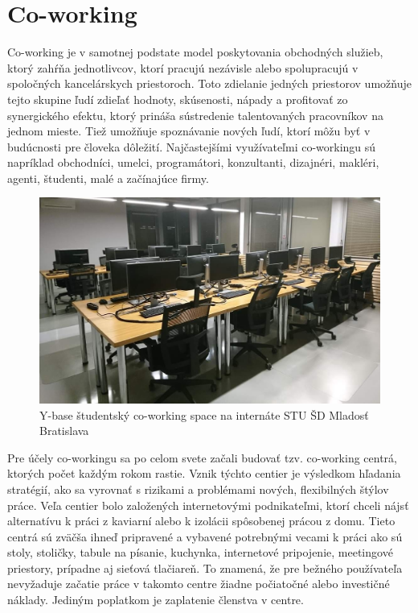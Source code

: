 \section{Co-working}
\indent Co-working je v samotnej podstate model poskytovania obchodných služieb, ktorý zahŕňa jednotlivcov, ktorí pracujú nezávisle alebo spolupracujú v spoločných kancelárskych priestoroch. Toto zdielanie jedných priestorov umožňuje tejto skupine ľudí zdieľať hodnoty, skúsenosti, nápady a profitovať zo synergického efektu, ktorý prináša sústredenie talentovaných pracovníkov na jednom mieste. Tiež umožňuje spoznávanie nových ľudí, ktorí môžu byť v budúcnosti pre človeka dôležití. Najčastejšími využívateľmi co-workingu sú napríklad obchodníci, umelci, programátori, konzultanti, dizajnéri, makléri, agenti, študenti, malé a začínajúce firmy.

\begin{figure}[H]
    \centering
    \includegraphics[scale=0.40]{img/ybase.jpg}
    \caption{Y-base študentský co-working space na internáte STU ŠD Mladosť Bratislava}
    \label{fig:img-ybase}
\end{figure}

\indent Pre účely co-workingu sa po celom svete začali budovať tzv. co-working centrá, ktorých počet každým rokom rastie. Vznik týchto centier je výsledkom hľadania stratégií, ako sa vyrovnať s rizikami a problémami nových, flexibilných štýlov práce. Veľa centier bolo založených internetovými podnikateľmi, ktorí chceli nájsť alternatívu k práci z kaviarní alebo k izolácii spôsobenej prácou z domu. Tieto centrá sú zväčša ihneď pripravené a vybavené potrebnými vecami k práci ako sú stoly, stoličky, tabule na písanie, kuchynka, internetové pripojenie, meetingové priestory, prípadne aj sieťová tlačiareň. To znamená, že pre bežného používateľa nevyžaduje začatie práce v takomto centre žiadne počiatočné alebo investičné náklady. Jediným poplatkom je zaplatenie členstva v centre. 

